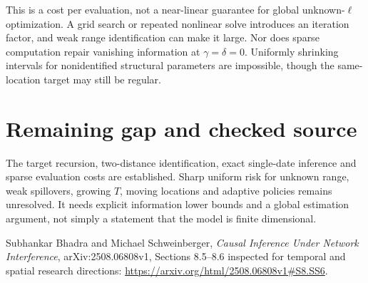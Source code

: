 \documentclass[11pt]{article}
\begin{document}
This is a cost per evaluation, not a near-linear guarantee for global unknown-$\ell$ optimization. A grid search or repeated nonlinear solve introduces an iteration factor, and weak range identification can make it large. Nor does sparse computation repair vanishing information at $\gamma=\delta=0$. Uniformly shrinking intervals for nonidentified structural parameters are impossible, though the same-location target may still be regular.

\section{Remaining gap and checked source}
The target recursion, two-distance identification, exact single-date inference and sparse evaluation costs are established. Sharp uniform risk for unknown range, weak spillovers, growing $T$, moving locations and adaptive policies remains unresolved. It needs explicit information lower bounds and a global estimation argument, not simply a statement that the model is finite dimensional.

Subhankar Bhadra and Michael Schweinberger, \emph{Causal Inference Under Network Interference}, arXiv:2508.06808v1, Sections 8.5--8.6 inspected for temporal and spatial research directions:
\url{https://arxiv.org/html/2508.06808v1#S8.SS6}.
\end{document}
